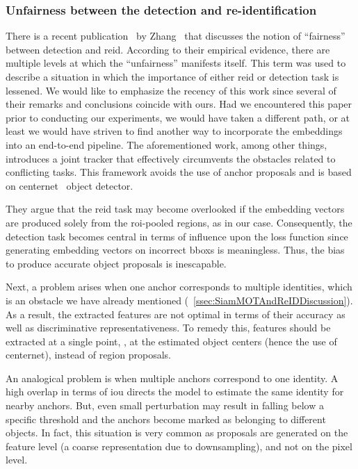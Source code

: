 \subsubsection{Unfairness between the detection and re-identification}

There is a recent publication~\cite{zhang2021fairmot} by Zhang~\etal{} that discusses the notion of ``fairness'' between detection and \gls{reid}. According to their empirical evidence, there are multiple levels at which the ``unfairness'' manifests itself. This term was used to describe a situation in which the importance of either \gls{reid} or detection task is lessened. We would like to emphasize the recency of this work since several of their remarks and conclusions coincide with ours. Had we encountered this paper prior to conducting our experiments, we would have taken a different path, or at least we would have striven to find another way to incorporate the embeddings into an end-to-end pipeline. The aforementioned work, among other things, introduces a joint tracker that effectively circumvents the obstacles related to conflicting tasks. This framework avoids the use of anchor proposals and is based on \gls{centernet}~\cite{zhou2019centernet} object detector.

They argue that the \gls{reid} task may become overlooked if the embedding vectors are produced solely from the \gls{roi}-pooled regions, as in our case. Consequently, the detection task becomes central in terms of influence upon the loss function since generating embedding vectors on incorrect \glspl{bbox} is meaningless. Thus, the bias to produce accurate object proposals is inescapable.

Next, a problem arises when one anchor corresponds to multiple identities, which is an obstacle we have already mentioned (\sectiontext{}~\ref{ssec:SiamMOTAndReIDDiscussion}). As a result, the extracted features are not optimal in terms of their accuracy as well as discriminative representativeness. To remedy this, features should be extracted at a single point, \ietext{}, at the estimated object centers (hence the use of \gls{centernet}), instead of region proposals.

An analogical problem is when multiple anchors correspond to one identity. A high overlap in terms of \gls{iou} directs the model to estimate the same identity for nearby anchors. But, even small perturbation may result in falling below a specific threshold and the anchors become marked as belonging to different objects. In fact, this situation is very common as proposals are generated on the feature level (a coarse representation due to downsampling), and not on the pixel level.


